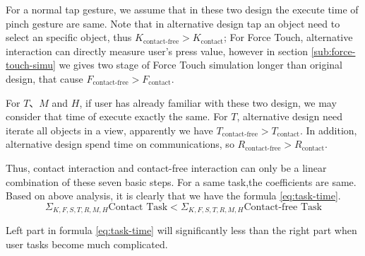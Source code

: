 For a normal tap gesture, we assume that in these two design the execute time of pinch gesture are same. Note that in alternative design tap an object need to select an specific object, thus $K_{\text{contact-free}}>K_{\text{contact}}$; For Force Touch, alternative interaction can directly measure user's press value, however in section \ref{sub:force-touch-simu} we gives two stage of Force Touch simulation longer than original design, that cause $F_{\text{contact-free}}>F_{\text{contact}}$.

For $T$、$M$ and $H$, if user has already familiar with these two design, we may consider that time of execute exactly the same. For $T$, alternative design need iterate all objects in a view, apparently we have $T_{\text{contact-free}}>T_{\text{contact}}$. In addition, alternative design spend time on communications, so $R_{\text{contact-free}}>R_{\text{contact}}$.

Thus, contact interaction and contact-free interaction can only be a linear combination of these seven basic steps. For a same task,the coefficients are same. Based on above analysis, it is clearly that we have the formula \ref{eq:task-time}.
\begin{equation}
    \label{eq:task-time}
    \Sigma_{K,F,S,T,R,M,H}{\text{Contact Task}} < \Sigma_{K,F,S,T,R,M,H}{\text{Contact-free Task}}
\end{equation}

Left part in formula \ref{eq:task-time}  will significantly less than the right part when user tasks become much complicated.

